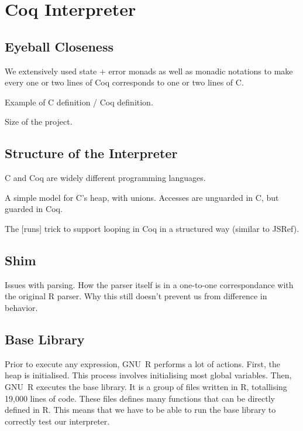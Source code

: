 \documentclass[
    sigplan,
    10pt,
    review, %
    natbib=false %
 ]{acmart}
\begin{document}
\section{Coq Interpreter}
\label{sec:coq:interp}

\subsection{Eyeball Closeness}
\label{sec:eyeball:closeness}

We extensively used state + error monads as well as monadic notations
to make every one or two lines of Coq corresponds to one or two lines of C.

Example of C definition / Coq definition.

Size of the project.

\subsection{Structure of the Interpreter}
\label{sec:coq:structure}

C and Coq are widely different programming languages.

A simple model for C's heap, with unions.
Accesses are unguarded in C, but guarded in Coq.

The [runs] trick to support looping in Coq in a structured way (similar to JSRef).

\subsection{Shim}
\label{sec:shim}

Issues with parsing.
How the parser itself is in a one-to-one correspondance with the original R parser.
Why this still doesn't prevent us from difference in behavior.

\subsection{Base Library}
\label{sec:library}

Prior to execute any expression, GNU~R performs a lot of actions.
First, the heap is initialised.
This process involves initialising most global variables.
Then, GNU~R executes the base library.
It is a group of files written in R,
totallising 19,000 lines of code.
These files defines many functions that can be directly defined in R.
%
This means that we have to be able to run the base library
to correctly test our interpreter.
\end{document}

